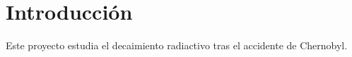 \section{Introducción}

Este proyecto estudia el decaimiento radiactivo tras el accidente de Chernobyl.
